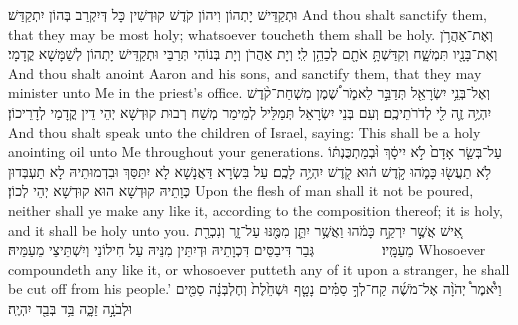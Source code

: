 {{וּתְקַדֵּישׁ יָתְהוֹן וִיהוֹן קֹדֶשׁ קוּדְשִׁין כָּל דְּיִקְרַב בְּהוֹן יִתְקַדַּשׁ׃}
{And thou shalt sanctify them, that they may be most holy; whatsoever toucheth them shall be holy.}{}
{וְאֶת־אַהֲרֹ֥ן וְאֶת־בָּנָ֖יו תִּמְשָׁ֑ח וְקִדַּשְׁתָּ֥ אֹתָ֖ם לְכַהֵ֥ן לִֽי׃}
{וְיָת אַהֲרֹן וְיָת בְּנוֹהִי תְּרַבֵּי וּתְקַדֵּישׁ יָתְהוֹן לְשַׁמָּשָׁא קֳדָמָי׃}
{And thou shalt anoint Aaron and his sons, and sanctify them, that they may minister unto Me in the priest’s office.}{}
{וְאֶל־בְּנֵ֥י יִשְׂרָאֵ֖ל תְּדַבֵּ֣ר לֵאמֹ֑ר שֶׁ֠מֶן מִשְׁחַת־קֹ֨דֶשׁ יִהְיֶ֥ה זֶ֛ה לִ֖י לְדֹרֹתֵיכֶֽם׃
}
{וְעִם בְּנֵי יִשְׂרָאֵל תְּמַלֵּיל לְמֵימַר מְשַׁח רְבוּת קוּדְשָׁא יְהֵי דֵין קֳדָמַי לְדָרֵיכוֹן׃}
{And thou shalt speak unto the children of Israel, saying: This shall be a holy anointing oil unto Me throughout your generations.}{}
{עַל־בְּשַׂ֤ר אָדָם֙ לֹ֣א יִיסָ֔ךְ וּ֨בְמַתְכֻּנְתּ֔וֹ לֹ֥א תַעֲשׂ֖וּ כָּמֹ֑הוּ קֹ֣דֶשׁ ה֔וּא קֹ֖דֶשׁ יִהְיֶ֥ה לָכֶֽם׃
}
{עַל בִּשְׂרָא דַּאֲנָשָׁא לָא יִתַּסַּךְ וּבִדְמוּתֵיהּ לָא תַעְבְּדוּן כְּוָתֵיהּ קוּדְשָׁא הוּא קוּדְשָׁא יְהֵי לְכוֹן׃}
{Upon the flesh of man shall it not be poured, neither shall ye make any like it, according to the composition thereof; it is holy, and it shall be holy unto you.}{}
{אִ֚ישׁ אֲשֶׁ֣ר יִרְקַ֣ח כָּמֹ֔הוּ וַאֲשֶׁ֥ר יִתֵּ֛ן מִמֶּ֖נּוּ עַל־זָ֑ר וְנִכְרַ֖ת מֵעַמָּֽיו׃ \setuma         
}
{גְּבַר דִּיבַסֵּים דִּכְוָתֵיהּ וּדְיִתֵּין מִנֵּיהּ עַל חִילוֹנַי וְיִשְׁתֵּיצֵי מֵעַמֵּיהּ׃}
{Whosoever compoundeth any like it, or whosoever putteth any of it upon a stranger, he shall be cut off from his people.’}{}
{וַיֹּ֩אמֶר֩ יְהֹוָ֨ה אֶל־מֹשֶׁ֜ה קַח־לְךָ֣ סַמִּ֗ים נָטָ֤ף \pasek  וּשְׁחֵ֙לֶת֙ וְחֶלְבְּנָ֔ה סַמִּ֖ים וּלְבֹנָ֣ה זַכָּ֑ה בַּ֥ד בְּבַ֖ד יִהְיֶֽה׃
}}
